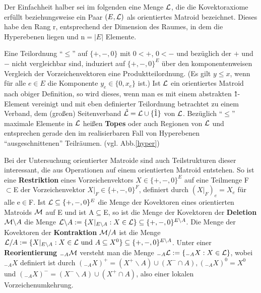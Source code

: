 Der Einfachheit halber sei im folgenden eine Menge ${\cal L}$, die die
Kovektoraxiome erfüllt beziehungsweise ein Paar $(E,{\cal L})$ als
orientiertes Matroid bezeichnet. Dieses habe den Rang r, entsprechend der
Dimension des Raumes, in dem die Hyperebenen liegen und n$=|E|$ Elemente.

Eine Teilordnung "`$\leq$"' auf $\{+,-,0\}$ mit $0<+$, $0<-$ und bezüglich
der $+$ und $-$ nicht vergleichbar sind, induziert auf $\{+,-,0\}^E$ über
den komponentenweisen Vergleich der Vorzeichenvektoren eine Produktteilordnung.
(Es gilt $y\leq x$, wenn für alle $e\in E$ die Komponente $y_e\in\{0,x_e\}$
ist.) Ist ${\cal L}$ ein orientiertes Matroid nach obiger Definition, so wird
dieses, wenn man es mit einem abstrakten \^1-Element vereinigt und mit
eben definierter Teilordnung betrachtet zu einem Verband, dem (großen)
Seitenverband $\hat{\cal L}={\cal L}\cup \{\hat{1}\}$ von
$\cal L$. Bezüglich "`$\leq$"' maximale Elemente in $\cal L$ heißen
{\bf Topes} oder auch Regionen von
$\cal L$ und entsprechen gerade den im realisierbaren Fall von Hyperebenen
"`ausgeschnittenen"' Teilräumen. (vgl. Abb.\ref{hyper})

Bei der Untersuchung orientierter Matroide sind auch Teilstrukturen dieser
interessant, die aus Operationen auf einem orientierten Matroid entstehen. So
ist eine {\bf Restriktion} eines Vorzeichenvektors
$X\in\{+,-,0\}^E$ auf eine Teilmenge F$\subset$E der Vorzeichenvektor
$X|_F\in\{+,-,0\}^F$, definiert durch $(X|_F)_e=X_e$ für alle e$\in$F. Ist
${\cal L}\subseteq\{+,-,0\}^E$
die Menge der Kovektoren eines orientierten Matroids $\cal M$ auf E und ist
A$\subseteq$E, so ist die Menge der Kovektoren der {\bf Deletion}
${\cal M}\backslash A$ die Menge ${\cal L}\backslash A
:=\{X|_{E\backslash A}:X\in{\cal L}\}\subseteq\{+,-,0\}^{E\backslash A}$.
Die Menge der Kovektoren der {\bf Kontraktion} ${\cal M}/A$
ist die Menge ${\cal L}/ A:=\{X|_{E\backslash A}:X\in{\cal L}\mbox{ und }
A\subseteq X^0\}\subseteq\{+,-,0\}^{E\backslash A}$.
Unter einer {\bf Reorientierung} $_{-A}{\cal M}$ versteht
man die Menge $_{-A}{\cal L}:=\{_{-A}X:X\in{\cal L}\}$, wobei $_{-A}X$ definiert
ist durch $(_{-A}X)^+=(X^+\backslash A)\cup (X^-\cap A), (_{-A}X)^0=X^0$ und
$(_{-A}X)^-=(X^-\backslash A)\cup (X^+\cap A)$, also einer lokalen
Vorzeichenumkehrung.

